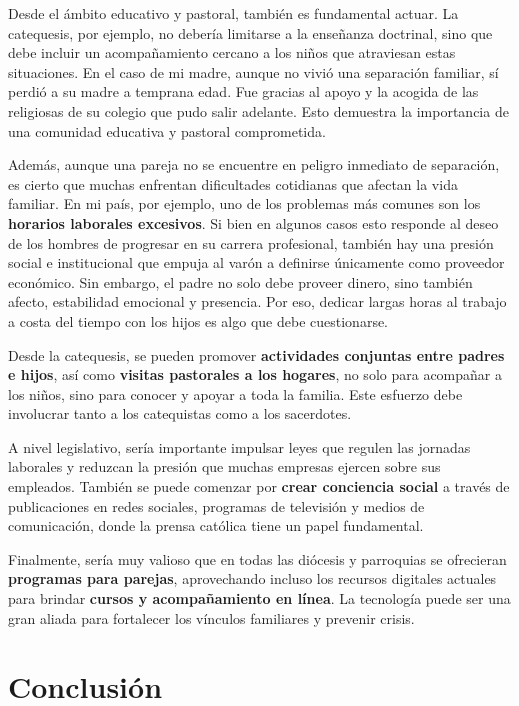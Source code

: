 \documentclass[a4paper,12pt]{article}
\begin{document}
Desde el ámbito educativo y pastoral, también es fundamental actuar. La catequesis, por ejemplo, no debería limitarse a la enseñanza doctrinal, sino que debe incluir un acompañamiento cercano a los niños que atraviesan estas situaciones. En el caso de mi madre, aunque no vivió una separación familiar, sí perdió a su madre a temprana edad. Fue gracias al apoyo y la acogida de las religiosas de su colegio que pudo salir adelante. Esto demuestra la importancia de una comunidad educativa y pastoral comprometida.

Además, aunque una pareja no se encuentre en peligro inmediato de separación, es cierto que muchas enfrentan dificultades cotidianas que afectan la vida familiar. En mi país, por ejemplo, uno de los problemas más comunes son los \textbf{horarios laborales excesivos}. Si bien en algunos casos esto responde al deseo de los hombres de progresar en su carrera profesional, también hay una presión social e institucional que empuja al varón a definirse únicamente como proveedor económico. Sin embargo, el padre no solo debe proveer dinero, sino también afecto, estabilidad emocional y presencia. Por eso, dedicar largas horas al trabajo a costa del tiempo con los hijos es algo que debe cuestionarse.

Desde la catequesis, se pueden promover \textbf{actividades conjuntas entre padres e hijos}, así como \textbf{visitas pastorales a los hogares}, no solo para acompañar a los niños, sino para conocer y apoyar a toda la familia. Este esfuerzo debe involucrar tanto a los catequistas como a los sacerdotes.

A nivel legislativo, sería importante impulsar leyes que regulen las jornadas laborales y reduzcan la presión que muchas empresas ejercen sobre sus empleados. También se puede comenzar por \textbf{crear conciencia social} a través de publicaciones en redes sociales, programas de televisión y medios de comunicación, donde la prensa católica tiene un papel fundamental.

Finalmente, sería muy valioso que en todas las di\'ocesis y parroquias se ofrecieran \textbf{programas para parejas}, aprovechando incluso los recursos digitales actuales para brindar \textbf{cursos y acompañamiento en línea}. La tecnología puede ser una gran aliada para fortalecer los vínculos familiares y prevenir crisis.

\newpage
\section*{Conclusi\'on}
\end{document}
